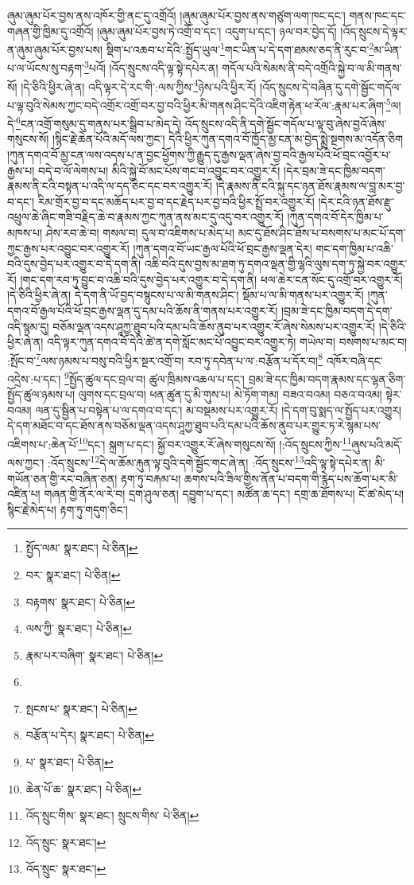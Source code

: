 ཞུམ་ཞུམ་པོར་བྱས་ནས་འཁོར་གྱི་ནང་དུ་འགྲོའོ། །ཞུམ་ཞུམ་པོར་བྱས་ནས་གཙུག་ལག་ཁང་དང་། གནས་ཁང་དང་གཞན་གྱི་ཁྱིམ་དུ་འགྲོའོ། །ཞུམ་ཞུམ་པོར་བྱས་ཏེ་འགྲོ་བ་དང་། འདུག་པ་དང་། ཉལ་བར་བྱེད་དོ། །འོད་སྲུངས་དེ་ལྟར་ན་ཞུམ་ཞུམ་པོར་བྱས་པས། སྡིག་པ་འཆབ་པ་དེའི་:སྤྱོད་ཡུལ་\footnote{སྤྱོད་ལམ་  སྣར་ཐང་།  པེ་ཅིན། }གང་ཡིན་པ་དེ་དག་ཐམས་ཅད་ནི་རུང་བ་\footnote{བར་  སྣར་ཐང་།  པེ་ཅིན། }མ་ཡིན་པ་ལ་ཡོངས་སུ་བརྟག་\footnote{བརྟགས་  སྣར་ཐང་།  པེ་ཅིན། }པའོ། །འོད་སྲུངས་འདི་ལྟ་སྟེ་དཔེར་ན། གདོལ་པའི་སེམས་ནི་བདེ་འགྲོའི་སྐྱེ་བ་ལ་མི་གནས་སོ། །དེ་ཅིའི་ཕྱིར་ཞེ་ན། འདི་ལྟར་དེ་རང་གི་:ལས་ཀྱིས་\footnote{ལས་ཀྱི་  སྣར་ཐང་།  པེ་ཅིན། }ཉེས་པའི་ཕྱིར་རོ། །འོད་སྲུངས་དེ་བཞིན་དུ་དགེ་སྦྱོང་གདོལ་པ་ལྟ་བུའི་སེམས་ཀྱང་བདེ་འགྲོར་འགྲོ་བར་བྱ་བའི་ཕྱིར་མི་གནས་ཤིང་དེའི་འཇིག་རྟེན་ཕ་རོལ་:རྣམ་པར་ཞིག་\footnote{རྣམ་པར་བཞིག་  སྣར་ཐང་།  པེ་ཅིན། }ལ། དེ་\footnote{}ངན་འགྲོ་གསུམ་དུ་གནས་པར་སྒྲིབ་པ་མེད་དེ། འོད་སྲུངས་འདི་ནི་དགེ་སྦྱོང་གདོལ་པ་ལྟ་བུ་ཞེས་བྱའོ་ཞེས་གསུངས་སོ། །སྙིང་རྗེ་ཆེན་པོའི་མདོ་ལས་ཀྱང་། དེའི་ཕྱིར་ཀུན་དགའ་བོ་ཁྱོད་མྱ་ངན་མ་བྱེད་སྨྲེ་སྔགས་མ་འདོན་ཅིག །ཀུན་དགའ་བོ་མྱ་ངན་ལས་འདས་པ་ན་བྱང་ཕྱོགས་ཀྱི་རྒྱུད་དུ་རྒྱས་ལྡན་ཞེས་བྱ་བའི་རྒྱལ་པོའི་ཕོ་བྲང་འབྱོར་པ་རྒྱས་པ། བདེ་བ་ལོ་ལེགས་པ། མིའི་སྐྱེ་བོ་མང་པོས་གང་བ་འབྱུང་བར་འགྱུར་རོ། །དེར་བྲམ་ཟེ་དང་ཁྱིམ་བདག་རྣམས་ནི་ངའི་བསྟན་པ་འདི་ལ་དད་ཅིང་དང་བར་འགྱུར་རོ། །དེ་རྣམས་ནི་ངའི་སྐུ་དང་ཉན་ཐོས་རྣམས་ལ་བླ་མར་བྱ་བ་དང་། རིམ་གྲོར་བྱ་བ་དང་མཆོད་པར་བྱ་བ་དང་རྗེད་པར་བྱ་བའི་ཕྱིར་སྤྲོ་བར་འགྱུར་རོ། །དེར་ངའི་ཉན་ཐོས་རྫུ་འཕྲུལ་ཆེ་ཞིང་གཟི་བརྗིད་ཆེ་བ་རྣམས་ཀྱང་ཀུན་ནས་མང་དུ་འདུ་བར་འགྱུར་རོ། །ཀུན་དགའ་བོ་དེར་ཁྱིམ་པ་མཁས་པ། ཤེས་རབ་ཆེ་བ། གསལ་བ། དུལ་བ་འཇིགས་པ་མེད་པ། མང་དུ་ཐོས་ཤིང་ཐོས་པ་བསགས་པ་མང་པོ་དག་ཀྱང་རྒྱས་པར་འབྱུང་བར་འགྱུར་རོ། །ཀུན་དགའ་བོ་ཡང་རྒྱལ་པོའི་ཕོ་བྲང་རྒྱས་ལྡན་དེར། གང་དག་ཁྱིམ་པ་འཆི་བའི་དུས་བྱེད་པར་འགྱུར་བ་དེ་དག་ནི། འཆི་བའི་དུས་བྱས་མ་ཐག་ཏུ་དགའ་ལྡན་གྱི་ལྷའི་ལུས་དག་ཏུ་སྐྱེ་བར་འགྱུར་རོ། །གང་དག་རབ་ཏུ་བྱུང་བ་འཆི་བའི་དུས་བྱེད་པར་འགྱུར་བ་དེ་དག་ནི། ཕལ་ཆེར་ངན་སོང་དུ་འགྲོ་བར་འགྱུར་རོ། །དེ་ཅིའི་ཕྱིར་ཞེ་ན། དེ་དག་ནི་ཡོ་བྱད་བསྙུངས་པ་ལ་མི་གནས་ཤིང་། སྡོམ་པ་ལ་མི་གནས་པར་འགྱུར་རོ། །ཀུན་དགའ་བོ་རྒྱལ་པོའི་ཕོ་བྲང་རྒྱས་ལྡན་དུ་དམ་པའི་ཆོས་ནི་གནས་པར་འགྱུར་རོ། །བྲམ་ཟེ་དང་ཁྱིམ་བདག་དེ་དག་འདི་སྙམ་དུ། བཅོམ་ལྡན་འདས་ཤཱཀྱ་ཐུབ་པའི་དམ་པའི་ཆོས་ནུབ་པར་འགྱུར་རོ་ཞེས་སེམས་པར་འགྱུར་རོ། །དེ་ཅིའི་ཕྱིར་ཞེ་ན། འདི་ལྟར་ཀུན་དགའ་བོ་དེའི་ཚེ་ན་དགེ་སློང་མང་པོ་འབྱུང་བར་འགྱུར་ཏེ། གཡེལ་བ། བསགས་པ་མང་བ། :སྤོང་བ་\footnote{སྤངས་པ་  སྣར་ཐང་།  པེ་ཅིན། }ལས་ཉམས་པ་བསུ་བའི་ཕྱིར་སྔར་འགྲོ་བ། རབ་ཏུ་དབེན་པ་ལ་:བརྩོན་པ་དོར་བ།\footnote{བརྩོན་པ་དེར།  སྣར་ཐང་།  པེ་ཅིན། } འཁོར་བཞི་དང་འདྲེས་:པ་དང་། \footnote{པ་  སྣར་ཐང་།  པེ་ཅིན། }སྤྱོད་ཚུལ་དང་བྲལ་བ། ཚུལ་ཁྲིམས་འཆལ་པ་དང་། བྲམ་ཟེ་དང་ཁྱིམ་བདག་རྣམས་དང་ལྷན་ཅིག་སྤྱོད་ཚུལ་ཉམས་པ། ལུགས་དང་བྲལ་བ། ཕན་ཚུན་དུ་མི་གུས་པ། མེ་ཏོག་གམ། བཟའ་བའམ། བཅའ་བའམ། སྟེར་བའམ། ལན་དུ་སྦྱིན་པ་བསྟེན་པ་ལ་དགའ་བ་དང་། མ་བསྡམས་པར་འགྱུར་རོ། །དེ་དག་བུ་སྨད་ལ་སྤྱོད་པར་འགྱུར། དེ་དག་མཐོང་བ་དང་ཐོས་ནས་བཅོམ་ལྡན་འདས་ཤཱཀྱ་ཐུབ་པའི་དམ་པའི་ཆོས་ནུབ་པར་གྱུར་ཏ་རེ་སྙམ་པས་འཇིགས་པ་:ཆེན་པོ་\footnote{ཆེན་པོ་ཆ་  སྣར་ཐང་།  པེ་ཅིན། }དང་། སྐྲག་པ་དང་། སྐྱོ་བར་འགྱུར་རོ་ཞེས་གསུངས་སོ། །:འོད་སྲུངས་ཀྱིས་\footnote{འོད་སྲུང་གིས་  སྣར་ཐང་། སྲུངས་གིས་  པེ་ཅིན། }ཞུས་པའི་མདོ་ལས་ཀྱང་། :འོད་སྲུངས་\footnote{འོད་སྲུང་  སྣར་ཐང་། }དེ་ལ་ཆོམ་རྐུན་ལྟ་བུའི་དགེ་སྦྱོང་གང་ཞེ་ན། :འོད་སྲུངས་\footnote{འོད་སྲུང་  སྣར་ཐང་། }འདི་ལྟ་སྟེ་དཔེར་ན། མི་གཡོན་ཅན་གྱི་རང་བཞིན་ཅན། རྟག་ཏུ་བརྐམ་པ། ཆགས་པའི་ཟིལ་གྱིས་ནོན་པ་བདག་གི་རྙེད་པས་ཆོག་པར་མི་འཛིན་པ། གཞན་གྱི་ནོར་ལ་རེ་བ། དྲག་ཤུལ་ཅན། དབྱུག་པ་དང་། མཚོན་ཆ་དང་། དགྲ་ཆ་ཐོགས་པ། ངོ་ཚ་མེད་པ། སྙིང་རྗེ་མེད་པ། རྟག་ཏུ་གདུག་ཅིང་། 